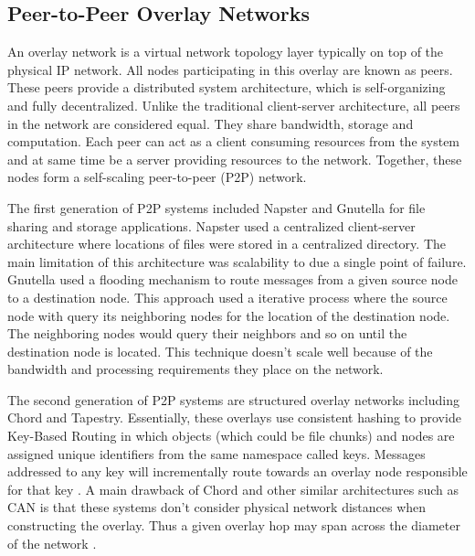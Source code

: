 \subsection{Peer-to-Peer Overlay Networks}
An overlay network is a virtual network topology layer typically on top of the physical IP network. All nodes participating in this overlay are known as peers. These peers provide a distributed system architecture, which is self-organizing and fully decentralized. Unlike the traditional client-server architecture, all peers in the network are considered equal. They share bandwidth, storage and computation. Each peer can act as a client consuming resources from the system and at same time be a server providing resources to the network. Together, these nodes form a self-scaling peer-to-peer (P2P) network.

The first generation of P2P systems included Napster and Gnutella for file sharing and storage applications. Napster used a centralized client-server architecture where locations of files were stored in a centralized directory. The main limitation of this architecture was scalability to due a single point of failure. Gnutella used a flooding mechanism to route messages from a given source node to a destination node. This approach used a iterative process where the source node with query its neighboring nodes for the location of the destination node. The neighboring nodes would query their neighbors and so on until the destination node is located. This technique doesn’t scale well because of the bandwidth and processing requirements they place on the network.

The second generation of P2P systems are structured overlay networks including Chord and Tapestry. Essentially, these overlays use consistent hashing to provide Key-Based Routing in which objects (which could be file chunks) and nodes are assigned unique identifiers from the same namespace called keys. Messages addressed to any key will incrementally route towards an overlay node responsible for that key \cite{chord}. A main drawback of Chord and other similar architectures such as CAN is that these systems don’t consider physical network distances when constructing the overlay. Thus a given overlay hop may span across the diameter of the network \cite{tapestry}. 

